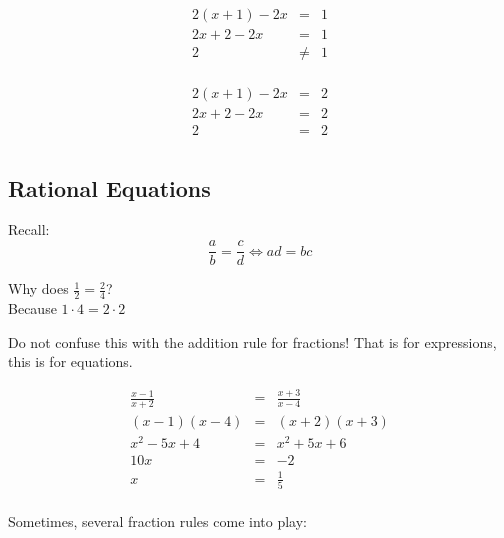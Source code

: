 \documentclass[letterpaper,12pt,fleqn]{article}
\begin{document}
\begin{example}[No solution]
  \begin{eqnarray*}
    2(x+1)-2x &=& 1 \\
    2x+2-2x &=& 1 \\
    2 &\ne& 1 \\
  \end{eqnarray*}
\end{example}

\begin{example}[Identity]
  \begin{eqnarray*}
    2(x+1)-2x &=& 2 \\
    2x+2-2x &=& 2 \\
    2 &=& 2 \\
  \end{eqnarray*}
\end{example}

\subsection*{Rational Equations}

Recall:
\[\frac{a}{b}=\frac{c}{d}\iff ad=bc\]

Why does $\frac{1}{2}=\frac{2}{4}$? \\
Because $1\cdot4=2\cdot2$

Do not confuse this with the addition rule for fractions! That is for
expressions, this is for equations.

\begin{example}
  \listbreak
  \begin{eqnarray*}
    \frac{x-1}{x+2} &=& \frac{x+3}{x-4} \\
    (x-1)(x-4) &=& (x+2)(x+3) \\
    x^2-5x+4 &=& x^2+5x+6 \\
    10x &=& -2 \\
    x &=& \frac{1}{5} \\
  \end{eqnarray*}
\end{example}
\newpage
Sometimes, several fraction rules come into play:
\end{document}
